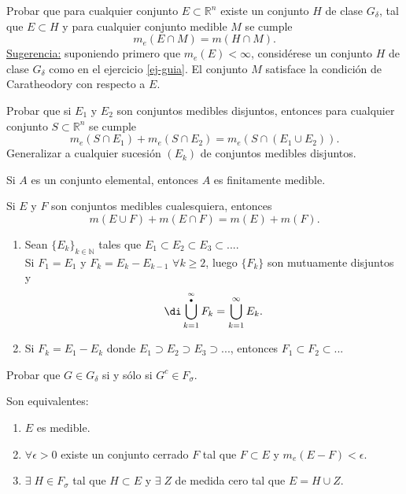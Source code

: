 \documentclass{book}
\newcommand{\rr}{\mathbb{R}}
\newcommand{\nn}{\mathbb{N}}
\begin{document}
  \begin{ejer}{}
	Probar que para cualquier  conjunto $E \subset \rr^n$ existe un conjunto $H$ de
  clase $G_{\delta}$, tal que $E \subset H$ y para cualquier conjunto medible $M$ se cumple
  $$m_e(E \cap M)=m(H\cap M).$$
  \underline{Sugerencia:} suponiendo primero que $m_e(E)<\infty$, considérese un conjunto
  $H$ de clase $G_{\delta}$ como en el ejercicio \ref{ej-guia}. El conjunto $M$ satisface la
  condición de Caratheodory con respecto a $E$.
   \end{ejer} 

   \begin{ejer}{}
	Probar que si $E_1$ y $E_2$ son conjuntos medibles disjuntos, entonces para cualquier
  conjunto $S \subset \rr^n$ se cumple 
  $$m_e(S\cap E_1)+m_e(S\cap E_2)=m_e(S\cap(E_1\cup E_2)). $$
  Generalizar a cualquier sucesión $(E_k)$ de conjuntos medibles disjuntos.
   \end{ejer} 

 \begin{ejer}{} 
   Si $A$ es un conjunto elemental, entonces $A$ es finitamente medible.
	\end{ejer} 
	
	 \begin{ejer}{} 
 Si $E$ y $F$ son conjuntos medibles cualesquiera, entonces
  $$m(E \cup F)+m(E \cap F)=m(E)+m(F).$$
	\end{ejer} 

   \begin{ejer}{} 
	\begin{enumerate}
  \item Sean $\{E_k\}_{k \in \nn}$ tales que $E_1 \subset E_2 \subset E_3\subset... $.
  \\
  Si $F_1=E_1$ y $F_k=E_k-E_{k-1}$ $\forall k\geq 2$, luego $\{F_k\}$ son mutuamente disjuntos
  y $$\di\bigcup_{k=1}^{\infty \atop \bullet} F_k=\bigcup_{k=1}^{\infty} E_k.$$
  \item Si $F_k=E_1-E_k$ donde $E_1\supset E_2 \supset E_3 \supset...$, entonces
  $F_1\subset F_2 \subset ...$ 
\end{enumerate} 
\end{ejer}  
%
   \begin{ejer}{}  Probar que $G \in G_{\delta}$ si y sólo si $G^c \in F_{\sigma}$.
	\end{ejer} 
%
%

  \begin{ejer}{} 
	Son equivalentes:
	\begin{enumerate}
    \item $E$ es medible.
    \item $\forall \epsilon >0$ existe un conjunto cerrado $F$ tal que $F \subset E$ y $m_e(E-F)<\epsilon$.
    \item $\exists\; H \in F_{\sigma}$ tal que $H\subset E$ y $\exists\; Z$ de medida cero tal que
    $E=H\cup Z$.
	\end{enumerate}
	\end{ejer} 
%
\end{document}
